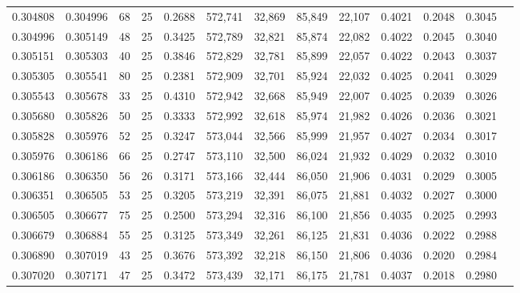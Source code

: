\begin{tabular}{rrrrrrrrrrrrr}
0.304808 & 0.304996 &    68 &  25 &                                     0.2688 & 572,741 &  32,869 &  85,849 &  22,107 & 0.4021 & 0.2048 & 0.3045 \\
0.304996 & 0.305149 &    48 &  25 &                                     0.3425 & 572,789 &  32,821 &  85,874 &  22,082 & 0.4022 & 0.2045 & 0.3040 \\
0.305151 & 0.305303 &    40 &  25 &                                     0.3846 & 572,829 &  32,781 &  85,899 &  22,057 & 0.4022 & 0.2043 & 0.3037 \\
0.305305 & 0.305541 &    80 &  25 &                                     0.2381 & 572,909 &  32,701 &  85,924 &  22,032 & 0.4025 & 0.2041 & 0.3029 \\
0.305543 & 0.305678 &    33 &  25 &                                     0.4310 & 572,942 &  32,668 &  85,949 &  22,007 & 0.4025 & 0.2039 & 0.3026 \\
0.305680 & 0.305826 &    50 &  25 &                                     0.3333 & 572,992 &  32,618 &  85,974 &  21,982 & 0.4026 & 0.2036 & 0.3021 \\
0.305828 & 0.305976 &    52 &  25 &                                     0.3247 & 573,044 &  32,566 &  85,999 &  21,957 & 0.4027 & 0.2034 & 0.3017 \\
0.305976 & 0.306186 &    66 &  25 &                                     0.2747 & 573,110 &  32,500 &  86,024 &  21,932 & 0.4029 & 0.2032 & 0.3010 \\
0.306186 & 0.306350 &    56 &  26 &                                     0.3171 & 573,166 &  32,444 &  86,050 &  21,906 & 0.4031 & 0.2029 & 0.3005 \\
0.306351 & 0.306505 &    53 &  25 &                                     0.3205 & 573,219 &  32,391 &  86,075 &  21,881 & 0.4032 & 0.2027 & 0.3000 \\
0.306505 & 0.306677 &    75 &  25 &                                     0.2500 & 573,294 &  32,316 &  86,100 &  21,856 & 0.4035 & 0.2025 & 0.2993 \\
0.306679 & 0.306884 &    55 &  25 &                                     0.3125 & 573,349 &  32,261 &  86,125 &  21,831 & 0.4036 & 0.2022 & 0.2988 \\
0.306890 & 0.307019 &    43 &  25 &                                     0.3676 & 573,392 &  32,218 &  86,150 &  21,806 & 0.4036 & 0.2020 & 0.2984 \\
0.307020 & 0.307171 &    47 &  25 &                                     0.3472 & 573,439 &  32,171 &  86,175 &  21,781 & 0.4037 & 0.2018 & 0.2980 \\

\end{tabular}
